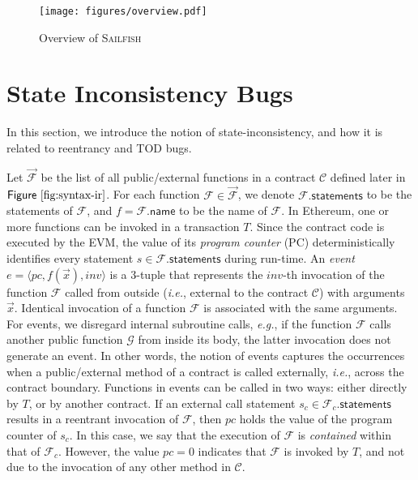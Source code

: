 \documentclass[conference, romanappendices]{tex/IEEEtran}
\theoremstyle{bfnote}
\newcommand{\toolname}{\textsc{Sailfish}\xspace}
\newcommand{\ethereum}{Ethereum}
\newcommand{\reentrancy}{{reentrancy}\xspace}
\newcommand{\si}{{state-inconsistency}\xspace}
\newcommand{\eg}{\textit{e.g.}}
\newcommand{\ie}{\textit{i.e.}}
\newcommand{\Fig}[1]{\ensuremath{\sf Figure~\ref{#1}}}
\begin{document}
\begin{figure}[t]
	\vspace{-2mm}
	\centering
	\texttt{[image: figures/overview.pdf]}
	\vspace{-10mm}
	\caption{Overview of \toolname}
	\label{fig:overview}
	\vspace{-6.5mm}
\end{figure}
 	\section{State Inconsistency Bugs}
\label{si_bugs}
In this section, we introduce the notion of \si, and how it is related to \reentrancy and {TOD\EndAccSupp{}} bugs.

Let $\vec{\mathcal{F}}$ be the list of all public/external functions in a contract $\mathcal{C}$ defined later in \Fig{fig:syntax-ir}.
For each function $\mathcal{F} \in \vec{\mathcal{F}}$, we denote $\mathcal{F}.\mathsf{statements}$ to be the statements of $\mathcal{F}$, and $f = \mathcal{F}.\mathsf{name}$ to be the name of $\mathcal{F}$.
In \ethereum, one or more functions can be invoked in a transaction $T$.
Since the contract code is executed by the {EVM\EndAccSupp{}}, the value of its \textit{program counter} (PC) deterministically identifies every statement $s \in \mathcal{F}.\mathsf{statements}$ during run-time.
An \textit{event} $e = \langle pc, f(\vec{x}), inv \rangle$ is a $3$-tuple that represents the $inv$-th invocation of the function $\mathcal{F}$ called from outside (\ie, external to the contract $\mathcal{C}$) with arguments $\vec{x}$.
Identical invocation of a function $\mathcal{F}$ is associated with the same arguments.
For events, we disregard internal {subroutine\EndAccSupp{}} calls, \eg, if the function $\mathcal{F}$ calls another public function $\mathcal{G}$ from inside its body, the latter invocation does not generate an event.
In other words, the notion of events captures the occurrences when a public/external method of a contract is called externally, \ie, across the contract boundary.
Functions in events can be called in two ways: either directly by $T$, or by another contract.
If an external call statement $s_c \in \mathcal{F}_c.\mathsf{statements}$ results in a reentrant invocation of $\mathcal{F}$, then $pc$ holds the value of the program counter of $s_c$.
In this case, we say that the execution of $\mathcal{F}$ is \textit{contained} within that of $\mathcal{F}_c$.
However, the value $pc = 0$ indicates that $\mathcal{F}$ is invoked by $T$, and not due to the invocation of any other method in $\mathcal{C}$. 
\end{document}
